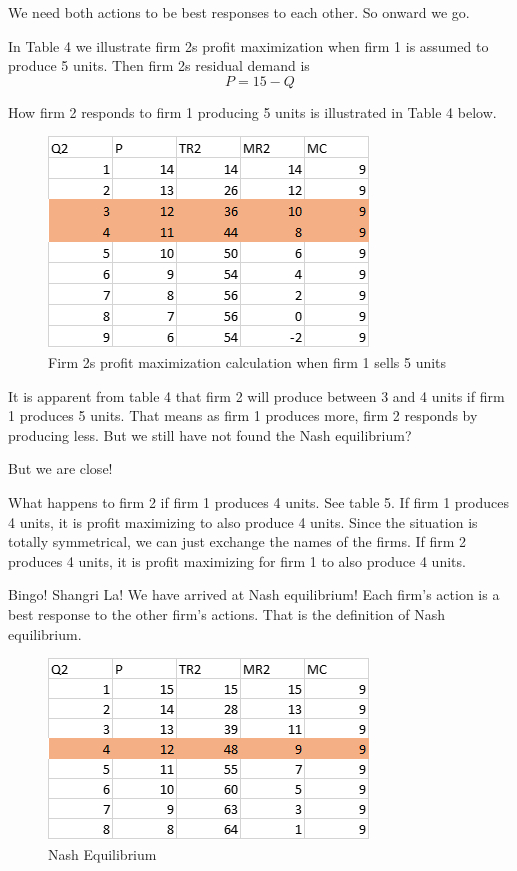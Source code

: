 \documentclass[
]{book}
\begin{document}
We need both actions to be best responses to each other. So onward we go.

In Table 4 we illustrate firm 2s profit maximization when firm 1 is assumed to produce 5 units. Then firm 2s residual demand is
\[P  =  15  -  Q\]

How firm 2 responds to firm 1 producing 5 units is illustrated in Table 4 below.

\begin{figure}

{\centering \includegraphics[width=0.5\linewidth]{img/ch8/fig4} 

}

\caption{Firm 2s profit maximization calculation when firm 1 sells 5 units}\label{fig:fig804}
\end{figure}

It is apparent from table 4 that firm 2 will produce between 3 and 4 units if firm 1 produces 5 units. That means as firm 1 produces more, firm 2 responds by producing less. But we still have not found the Nash equilibrium?

But we are close!

What happens to firm 2 if firm 1 produces 4 units. See table 5. If firm 1 produces 4 units, it is profit maximizing to also produce 4 units. Since the situation is totally symmetrical, we can just exchange the names of the firms. If firm 2 produces 4 units, it is profit maximizing for firm 1 to also produce 4 units.

Bingo!
Shangri La!
We have arrived at Nash equilibrium! Each firm's action is a best response to the other firm's actions. That is the definition of Nash equilibrium.

\begin{figure}

{\centering \includegraphics[width=0.5\linewidth]{img/ch8/fig5} 

}

\caption{Nash Equilibrium}\label{fig:fig805}
\end{figure}
\end{document}
